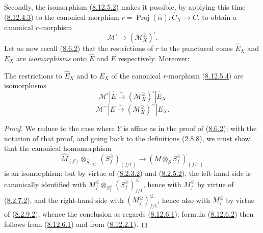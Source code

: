 \begin{env}[8.12.5]
Secondly, the isomorphism (\hyperref[II.8.12.5.2]{8.12.5.2}) makes it
possible, by applying this time (\hyperref[II.8.12.4.3]{8.12.4.3}) to the
canonical morphism $r=\operatorname{Proj}(\widehat{\alpha}):\widehat{C}_X\to
\widehat{C}$, to obtain a canonical $r$-morphism
\begin{equation}
\label{II.8.12.5.4}
  \mathcal{M}^{\square}\to(\mathcal{M}_X^{\geq})^{\square}.
\tag{8.12.5.4}
\end{equation}
Let us now recall (\hyperref[II.8.6.2]{8.6.2}) that the restrictions of
$r$ to the punctured cones $\widehat{E}_X$ and $E_X$ are \emph{isomorphisms}
onto $\widehat{E}$ and $E$ respectively. Moreover:
\end{env}

\begin{proposition}[8.12.6]
\label{II.8.12.6}
The restrictions to $\widehat{E}_X$ and to $E_X$ of the canonical $r$-morphism
\textup{(\hyperref[II.8.12.5.4]{8.12.5.4})} are isomorphisms
\begin{equation}
\label{II.8.12.6.1}
  \mathcal{M}^{\square}|\widehat{E}
  \xrightarrow{\sim}(\mathcal{M}_X^{\geq})^{\square}|\widehat{E}_X
\tag{8.12.6.1}
\end{equation}
\begin{equation}
\label{II.8.12.6.2}
  \mathcal{M}^{\sim}|E
  \xrightarrow{\sim}(\mathcal{M}_X^{\geq})^{\sim}|E_X.
\tag{8.12.6.2}
\end{equation}
\end{proposition}

\begin{proof}
We reduce to the case where $Y$ is affine as in the proof of
(\hyperref[II.8.6.2]{8.6.2}); with the notation of that proof, and
going back to the definitions (\hyperref[II.2.8.8]{2.8.8}), we must
show that the canonical homomorphism
\[
  \widehat{M}_{(f)}\otimes_{\widehat{S}_{(f)}}
  (S_f^{\geq})_{(f/1)}^{\widehat{\,}}
  \to(M\otimes_S S_f^{\geq})_{(f/1)}^{\widehat{\,}}
\]
is an isomorphism; but by virtue of
(\hyperref[II.8.2.3.2]{8.2.3.2}) and
(\hyperref[II.8.2.5.2]{8.2.5.2}), the left-hand side is canonically
identified with
$M_f^{\leq}\otimes_{S_f^{\leq}}(S_f^{\geq})_{f/1}^{\leq}$, hence with
$M_f^{\leq}$ by virtue of (\hyperref[II.8.2.7.2]{8.2.7.2}), and the
right-hand side with $(M_f^{\geq})_{f/1}^{\leq}$, hence also with $M_f^{\leq}$
by virtue of (\hyperref[II.8.2.9.2]{8.2.9.2}), whence the conclusion as
regards (\hyperref[II.8.12.6.1]{8.12.6.1}); formula
(\hyperref[II.8.12.6.2]{8.12.6.2}) then follows from
(\hyperref[II.8.12.6.1]{8.12.6.1}) and from
(\hyperref[II.8.12.2.1]{8.12.2.1}).
\end{proof}

